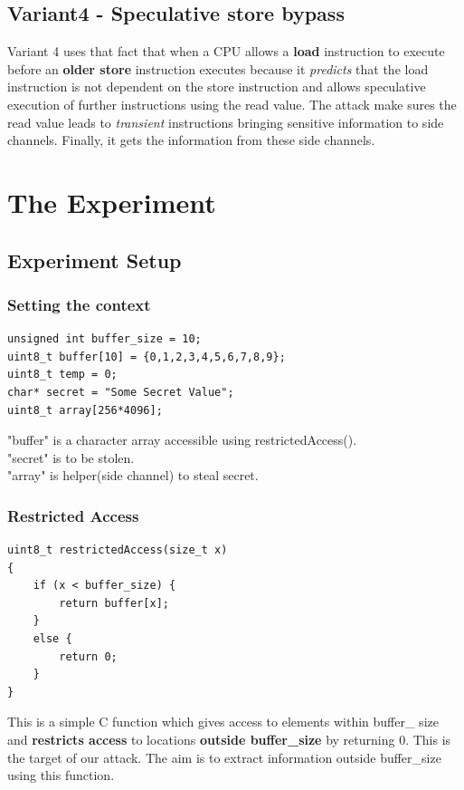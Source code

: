 \documentclass[12pt]{article}
\begin{document}
\subsection{Variant4 - Speculative store bypass}

Variant 4 uses that fact that when a CPU allows a \textbf{load} instruction to execute before an \textbf{older store} instruction executes because it \textit{predicts} that the load instruction is not dependent on the store instruction and allows speculative execution of further instructions using the read value.
The attack make sures the read value leads to \textit{transient} instructions bringing sensitive information to side channels. Finally, it gets the information from these side channels.

\section{The Experiment\cite{SeedLabs}}

\subsection{Experiment Setup}

\subsubsection{Setting the context}
\begin{lstlisting}[style=CStyle]
unsigned int buffer_size = 10;
uint8_t buffer[10] = {0,1,2,3,4,5,6,7,8,9};
uint8_t temp = 0;
char* secret = "Some Secret Value";
uint8_t array[256*4096];
\end{lstlisting}
"buffer" is a character array accessible using restrictedAccess().\\
"secret" is to be stolen.\\
"array" is helper(side channel) to steal secret.  

\subsubsection{Restricted Access}
\begin{lstlisting}[style=CStyle]
uint8_t restrictedAccess(size_t x)
{
	if (x < buffer_size) {
		return buffer[x];
	} 
	else {
		return 0;
	}
}
\end{lstlisting}
This is a simple C function which gives access to elements within buffer\_ size and \textbf{restricts access} to locations \textbf{outside buffer\_size} by returning 0. This is the target of our attack. The aim is to extract information outside buffer\_size using this function. 
\end{document}
